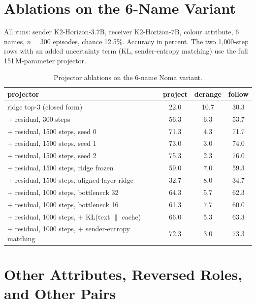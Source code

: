 \documentclass{article}
\begin{document}
\section{Ablations on the 6-Name Variant}
\label{app:ablations}

All runs: sender K2-Horizon-3.7B, receiver K2-Horizon-7B, colour attribute, 6 names, $n = 300$ episodes, chance 12.5\%. Accuracy in percent. The two 1,000-step rows with an added uncertainty term (KL, sender-entropy matching) use the full 151\,M-parameter projector.

\begin{table}[h]
\caption{Projector ablations on the 6-name Noma variant.}
\label{tab:ablations}
\vskip 0.1in
\begin{center}
\begin{small}
\begin{tabular}{lccc}
\toprule
projector & project & derange & follow \\
\midrule
ridge top-3 (closed form)                     & 22.0 & 10.7 & 30.3 \\
$+$ residual, 300 steps                       & 56.3 & 6.3  & 53.7 \\
$+$ residual, 1500 steps, seed 0              & 71.3 & 4.3  & 71.7 \\
$+$ residual, 1500 steps, seed 1              & 73.0 & 3.0  & 74.0 \\
$+$ residual, 1500 steps, seed 2              & 75.3 & 2.3  & 76.0 \\
$+$ residual, 1500 steps, ridge frozen        & 59.0 & 7.0  & 59.3 \\
$+$ residual, 1500 steps, aligned-layer ridge & 32.7 & 8.0  & 34.7 \\
$+$ residual, 1000 steps, bottleneck 32       & 64.3 & 5.7  & 62.3 \\
$+$ residual, 1000 steps, bottleneck 16       & 61.3 & 7.7  & 60.0 \\
$+$ residual, 1000 steps, $+$ KL(text $\|$ cache) & 66.0 & 5.3 & 63.3 \\
$+$ residual, 1000 steps, $+$ sender-entropy matching & 72.3 & 3.0 & 73.3 \\
\bottomrule
\end{tabular}
\end{small}
\end{center}
\end{table}

\section{Other Attributes, Reversed Roles, and Other Pairs}
\label{app:attrs}
\end{document}
